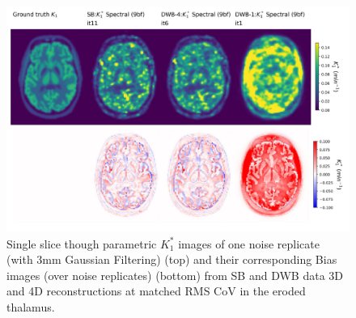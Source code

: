\begin{figure} [h!]
\centering
\includegraphics[scale=0.47,angle=0]{3_Results/3_2_Dynamic_Reconstruction_SimulationStudy/figures/BrainCuts/K1_BrainCuts.pdf}
\caption{Single slice though parametric $K_1^*$ images of one noise replicate (with 3mm Gaussian Filtering) (top) and their corresponding Bias images (over noise replicates) (bottom) from SB and DWB data 3D and 4D reconstructions at matched RMS CoV in the eroded thalamus.}
\label{fig:K1_cuts_bias_matched_rms_CoV}
\end{figure} 


